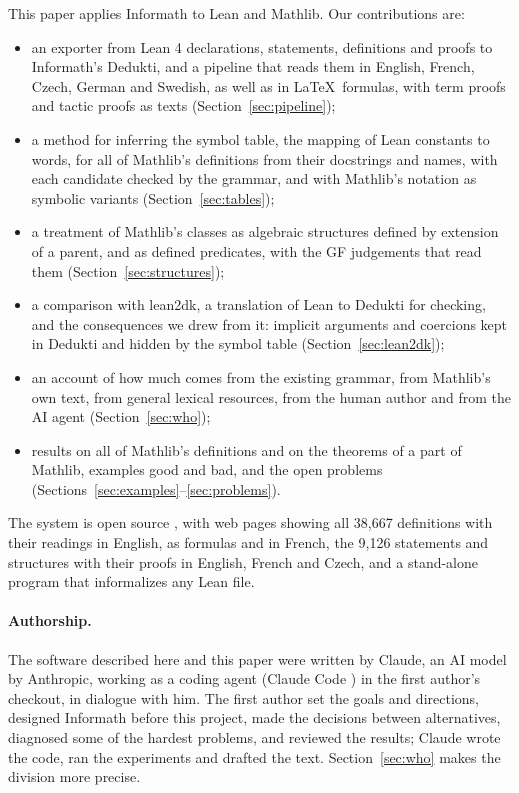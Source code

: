 \documentclass{easychair}
\begin{document}
This paper applies Informath to Lean and Mathlib. Our contributions are:
\begin{itemize}
\item an exporter from Lean 4 declarations, statements, definitions and proofs to Informath's
  Dedukti, and a pipeline that reads them in English, French, Czech, German and Swedish, as
  well as in \LaTeX\ formulas, with term proofs and tactic proofs as texts
  (Section~\ref{sec:pipeline});
\item a method for inferring the symbol table, the mapping of Lean constants to words, for all
  of Mathlib's definitions from their docstrings and names, with each candidate checked by the
  grammar, and with Mathlib's notation as symbolic variants (Section~\ref{sec:tables});
\item a treatment of Mathlib's classes as algebraic structures defined by extension of a
  parent, and as defined predicates, with the GF judgements that read them
  (Section~\ref{sec:structures});
\item a comparison with lean2dk, a translation of Lean to Dedukti for checking, and the
  consequences we drew from it: implicit arguments and coercions kept in Dedukti and hidden
  by the symbol table (Section~\ref{sec:lean2dk});
\item an account of how much comes from the existing grammar, from Mathlib's own text, from
  general lexical resources, from the human author and from the AI agent (Section~\ref{sec:who});
\item results on all of Mathlib's definitions and on the theorems of a part of Mathlib, examples
  good and bad, and the open problems
  (Sections~\ref{sec:examples}--\ref{sec:problems}).
\end{itemize}
The system is open source \cite{mathlib-informath}, with web pages showing all 38,667
definitions with their readings in English, as formulas and in French, the 9,126 statements and
structures with their proofs in English, French and Czech, and a stand-alone program that
informalizes any Lean file.

\paragraph{Authorship.} The software described here and this paper were written by Claude, an
AI model by Anthropic, working as a coding agent (Claude Code \cite{claude-code}) in the first
author's checkout, in dialogue with him. The first author set the goals and directions,
designed Informath before this project, made the decisions between alternatives, diagnosed
some of the hardest problems, and reviewed the results; Claude wrote the code, ran the
experiments and drafted the text. Section~\ref{sec:who} makes the division more precise.
\end{document}
